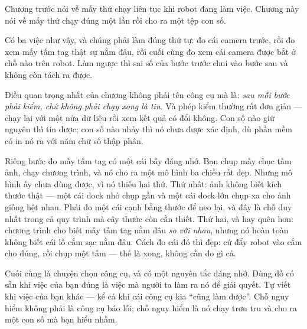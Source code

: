 \documentclass[../../marker.tex]{subfiles}
\begin{document}
\begin{traloi}
\end{traloi}

\begin{dongian}
Chương trước nói về mấy thứ chạy liên tục khi robot đang làm việc. Chương này nói về mấy thứ chạy đúng một lần rồi cho ra một tệp con số.

Có ba việc như vậy, và chúng phải làm đúng thứ tự: đo cái camera trước, rồi đo xem mấy tấm tag thật sự nằm đâu, rồi cuối cùng đo xem cái camera được bắt ở chỗ nào trên robot. Làm ngược thì sai số của bước trước chui vào bước sau và không còn tách ra được.

Điều quan trọng nhất của chương không phải tên công cụ mà là: \emph{sau mỗi bước phải kiểm, chứ không phải chạy xong là tin}. Và phép kiểm thường rất đơn giản --- chạy lại với một nửa dữ liệu rồi xem kết quả có đổi không. Con số nào giữ nguyên thì tin được; con số nào nhảy thì nó chưa được xác định, dù phần mềm có in nó ra với năm chữ số thập phân.

Riêng bước đo mấy tấm tag có một cái bẫy đáng nhớ. Bạn chụp mấy chục tấm ảnh, chạy chương trình, và nó cho ra một mô hình ba chiều rất đẹp. Nhưng mô hình ấy chưa dùng được, vì nó thiếu hai thứ. Thứ nhất: ảnh không biết kích thước thật --- một cái dock nhỏ chụp gần và một cái dock lớn chụp xa cho ảnh giống hệt nhau. Phải đo một cái cạnh bằng thước để neo lại, và đây là chỗ duy nhất trong cả quy trình mà cây thước còn cần thiết. Thứ hai, và hay quên hơn: chương trình cho biết mấy tấm tag nằm đâu \emph{so với nhau}, nhưng nó hoàn toàn không biết cái lỗ cắm sạc nằm đâu. Cách đo cái đó thì đẹp: cứ đẩy robot vào cắm cho đúng, rồi chụp một tấm --- thế là xong, không cần đo gì cả.

Cuối cùng là chuyện chọn công cụ, và có một nguyên tắc đáng nhớ. Dùng đồ có sẵn khi việc của bạn đúng là việc mà người ta làm ra nó để giải quyết. Tự viết khi việc của bạn khác --- kể cả khi cái công cụ kia ``cũng làm được''. Chỗ nguy hiểm không phải là công cụ báo lỗi; chỗ nguy hiểm là nó chạy trơn tru và cho ra một con số mà bạn hiểu nhầm.


\end{dongian}
\end{document}
